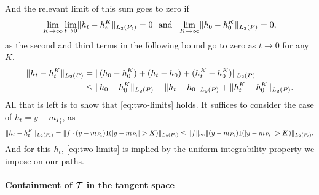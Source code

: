 And the relevant limit of this sum goes to zero if 
\begin{equation}
\label{eq:two-limits}
 \lim_{K \to \infty}\lim_{t \to 0}\norm{h_t-h_t^K}_{L_2(\P_t)}=0 \ \text{ and }\ \lim_{K \to \infty}\norm{h_0 - h_0^K}_{L_2(\P)}=0,
\end{equation}
as the second and third terms in the following bound go to zero as $t \to 0$ for any $K$.
\begin{align*} 
\norm{h_t - h_t^K}_{L_2(\P)}
&=\norm{ (h_0 - h_0^K) + (h_t - h_0) + (h_t^K-h_0^K) }_{L_2(\P)} \\
&\le \norm{ h_0 - h_0^K}_{L_2(\P)} + \norm{h_t - h_0}_{L_2(\P)} + \norm{h_t^K-h_0^K}_{L_2(\P)}. 
\end{align*}
All that is left is to show that \eqref{eq:two-limits} holds. It suffices to consider the case of $h_t = y-m_{P_t}$, as
\[ \norm{h_t - h_t^K}_{L_2(\P_t)} = \norm{f \cdot (y-m_{P_t}) 1(\abs{y - m_{P_t}}  > K)}_{L_2(\P_t)} \le \norm{f}_{\infty} \norm{(y-m_{P_t}) 1(\abs{y - m_{P_t}}  > K)}_{L_2(\P_t)}. \]
And for this $h_t$, \eqref{eq:two-limits} is implied by the uniform integrability property we impose on our paths.


\paragraph*{Containment of $\mathcal{T}$ in the tangent space}

